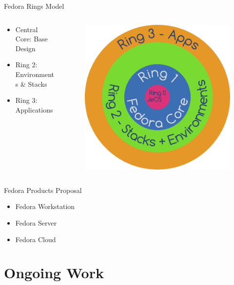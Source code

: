 \documentclass{beamer}
\begin{document}
\begin{frame}{Fedora Rings Model}
  \begin{columns}
    \begin{column}{.5\textwidth}
  \begin{itemize}
    \item Central Core: Base Design
    \item Ring 2: Environments \& Stacks
    \item Ring 3: Applications
  \end{itemize}
    \end{column}
    \begin{column}{.5\textwidth}
      \begin{figure}[htbp]
        \centering
        \includegraphics[width=.8\textwidth]{fedora-next-ring.pdf}
      \end{figure}
    \end{column}
  \end{columns}
\end{frame}

\begin{frame}{Fedora Products Proposal}
  \begin{itemize}
    \item Fedora Workstation
    \item Fedora Server
    \item Fedora Cloud
  \end{itemize}
\end{frame}

\section{Ongoing Work}
\end{document}
